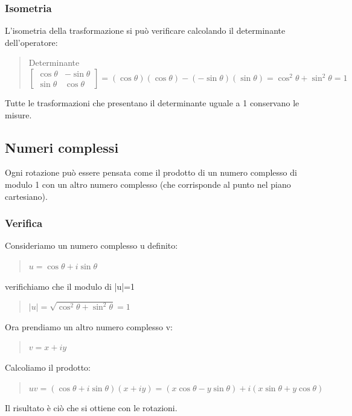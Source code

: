 \documentclass[a4paper]{article}
\begin{document}
\subsubsection{Isometria}
L'isometria della trasformazione si può verificare calcolando il determinante dell'operatore:
\begin{quote} \centering Determinante$\left[\begin{matrix}\cos\theta & -\sin\theta\\ \sin\theta & \cos\theta\end{matrix}\right]= (\cos\theta)(\cos\theta)-(-\sin\theta)(\sin\theta)= \cos^2\theta+\sin^2\theta=1
$\end{quote}
Tutte le trasformazioni che presentano il determinante uguale a 1 conservano le misure.
\subsection{Numeri complessi}
Ogni rotazione può essere pensata come il prodotto di un numero complesso di modulo 1 con un altro numero complesso (che corrisponde al punto nel piano cartesiano).
\subsubsection{Verifica}
Consideriamo un numero complesso u definito:
\begin{quote} \centering $u=\cos\theta+\textit{i}\sin\theta
$\end{quote}
verifichiamo che il modulo di |u|=1
\begin{quote} \centering$ |u|=\sqrt{\cos^2\theta+\sin^2\theta}=1
$\end{quote}
Ora prendiamo un altro numero complesso v:
\begin{quote} \centering$v=x+\textit{i}y 
$\end{quote}
Calcoliamo il prodotto:
\begin{quote} \centering$uv=(\cos\theta+\textit{i}\sin\theta)(x+\textit{i}y)=(x\cos\theta-y\sin\theta)+\textit{i}(x\sin\theta+y\cos\theta)
$\end{quote}
Il risultato è ciò che si ottiene con le rotazioni.
\end{document}

